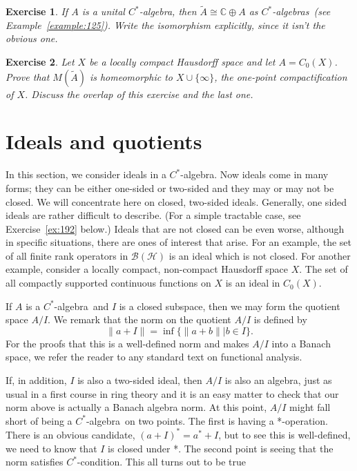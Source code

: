 \documentclass{book}
\newtheorem{exercise}{Exercise}[section]
\def\cstar{\(C^*\)-algebra}
\def\cstars{\(C^*\)-algebras}
\begin{document}
\begin{exercise}
  If \(A\) is a unital \cstar, then \(\tilde{A}\cong \mathbb{C}\oplus A\) as \cstars\ (see Example~\ref{example:125}). 
  Write the isomorphism explicitly, since it isn't the
  obvious one.
\end{exercise}
\begin{exercise}
  Let \(X\) be a locally compact Hausdorff space and let \(A = C_0(X)\). 
  Prove that \(M(\tilde{A})\) is homeomorphic to \(X \cup \{\infty\}\), the one-point compactification of \(X\). 
  Discuss the overlap of this exercise and the last one.
\end{exercise}

\section{Ideals and quotients}
In this section, we consider ideals in a \cstar. Now ideals come in many
forms; they can be either one-sided or two-sided and they may or may not be
closed. We will concentrate here on closed, two-sided ideals. Generally, one
sided ideals are rather difficult to describe. (For a simple tractable case, see
Exercise~\ref{ex:192} below.) Ideals that are not closed can be even worse, although
in specific situations, there are ones of interest that arise. For an example,
the set of all finite rank operators in \(\mathcal{B}(\mathcal{H})\) is an ideal which is not closed. For
another example, consider a locally compact, non-compact Hausdorff space
\(X\). The set of all compactly supported continuous functions on \(X\) is an ideal
in \(C_0(X)\).\par
If \(A\) is a \cstar\ and \(I\) is a closed subspace, then we may form the
quotient space \(A/I\). We remark that the norm on the quotient \(A/I\) is defined
by
\[\|a +I\| = \inf\{\|a+b\| |b\in I\}.\]
For the proofs that this is a well-defined norm and makes \(A/I\) into a Banach space, 
we refer the reader to any standard text on functional analysis.\par
If, in addition, \(I\) is also a two-sided ideal, then \(A/I\) is also an algebra,
just as usual in a first course in ring theory and it is an easy matter to check
that our norm above is actually a Banach algebra norm. At this point, \(A/I\)
might fall short of being a \cstar\ on two points. The first is having a
*-operation. There is an obvious candidate, \({(a+I)}^* = a^*+I\), but to see this
is well-defined, we need to know that \(I\) is closed under *. The second point
is seeing that the norm satisfies \(C^*\)-condition. This all turns out to be true
\end{document}
